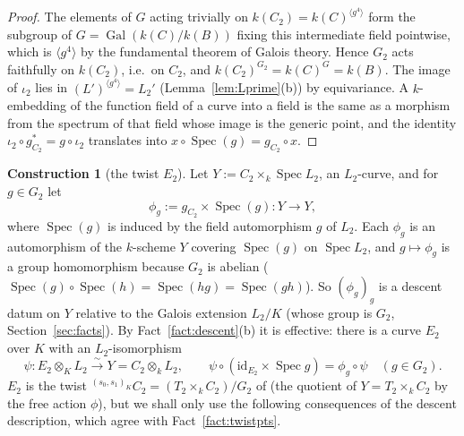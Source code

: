 \documentclass[11pt]{amsart}
\theoremstyle{definition}
\newtheorem{construction}[theorem]{Construction}
\theoremstyle{remark}
\newcommand{\Spec}{\operatorname{Spec}}
\newcommand{\Gal}{\operatorname{Gal}}
\begin{document}
\begin{proof}
The elements of $G$ acting trivially on $k(C_2)=k(C)^{\langle g^4\rangle}$ form the
subgroup of $G=\Gal(k(C)/k(B))$ fixing this intermediate field pointwise, which is
$\langle g^4\rangle$ by the fundamental theorem of Galois theory. Hence $G_2$ acts
faithfully on $k(C_2)$, i.e.\ on $C_2$, and $k(C_2)^{G_2}=k(C)^G=k(B)$. The image of
$\iota_2$ lies in $(L')^{\langle g^4\rangle}=L_2'$ (Lemma~\ref{lem:Lprime}(b)) by
equivariance. A $k$-embedding of the function field of a curve into a field is the same
as a morphism from the spectrum of that field whose image is the generic point, and the
identity $\iota_2\circ g_{C_2}^*=g\circ\iota_2$ translates into
$x\circ\Spec(g)=g_{C_2}\circ x$.
\end{proof}

\begin{construction}[the twist $E_2$]\label{con:twist}
Let $Y:=C_2\times_k\Spec L_2$, an $L_2$-curve, and for $g\in G_2$ let
\[
\phi_g:=g_{C_2}\times\Spec(g)\colon Y\to Y ,
\]
where $\Spec(g)$ is induced by the field automorphism $g$ of $L_2$. Each $\phi_g$ is an
automorphism of the $k$-scheme $Y$ covering $\Spec(g)$ on $\Spec L_2$, and
$g\mapsto\phi_g$ is a group homomorphism because $G_2$ is abelian
($\Spec(g)\circ\Spec(h)=\Spec(hg)=\Spec(gh)$). So $(\phi_g)_g$ is a descent datum on
$Y$ relative to the Galois extension $L_2/K$ (whose group is $G_2$, Section~\ref{sec:facts}).
By Fact~\ref{fact:descent}(b) it is effective: there is a curve $E_2$ over $K$ with an
$L_2$-isomorphism
\[
\psi\colon E_2\otimes_KL_2\xrightarrow{\ \sim\ }Y=C_2\otimes_kL_2,\qquad
\psi\circ(\mathrm{id}_{E_2}\times\Spec g)=\phi_g\circ\psi\quad(g\in G_2).
\]
$E_2$ is the twist ${}^{(s_0,s_1)_K}C_2=(T_2\times_kC_2)/G_2$ of \cite[\S2.4]{P}
(the quotient of $Y=T_2\times_kC_2$ by the free action $\phi$), but we shall only use the
following consequences of the descent description, which agree with
Fact~\ref{fact:twistpts}.
\end{construction}
\end{document}
